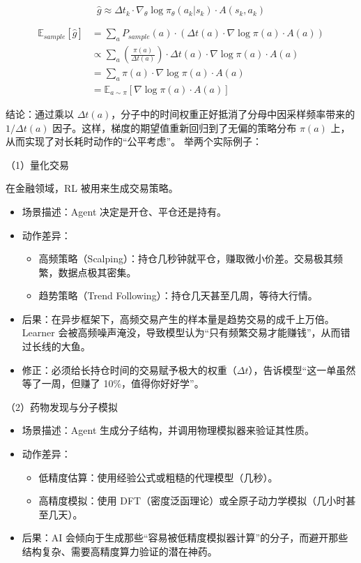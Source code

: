 \[
\hat{g}\approx \Delta t_k\cdot \nabla_\theta\log\pi_\theta(a_k|s_k)\cdot A(s_k,a_k)
\]

\[
\begin{aligned}
\mathbb{E}_{sample}[\hat{g}]
&= \sum_a P_{sample}(a)\cdot\left(\Delta t(a)\cdot\nabla\log\pi(a)\cdot A(a)\right)\\
&\propto \sum_a \left(\frac{\pi(a)}{\Delta t(a)}\right)\cdot\Delta t(a)\cdot\nabla\log\pi(a)\cdot A(a)\\
&= \sum_a \pi(a)\cdot\nabla\log\pi(a)\cdot A(a)\\
&= \mathbb{E}_{a\sim\pi}\left[\nabla\log\pi(a)\cdot A(a)\right]
\end{aligned}
\]

结论：通过乘以 \(\Delta t(a)\)，分子中的时间权重正好抵消了分母中因采样频率带来的 \(1/\Delta t(a)\) 因子。这样，梯度的期望值重新回归到了无偏的策略分布 \(\pi(a)\) 上，从而实现了对长耗时动作的``公平考虑''。
举两个实际例子：

（1）量化交易

在金融领域，RL 被用来生成交易策略。

\begin{itemize}
\tightlist
\item
  场景描述：Agent 决定是开仓、平仓还是持有。
\item
{}
  动作差异：

  \begin{itemize}
  \tightlist
  \item
    高频策略（Scalping）：持仓几秒钟就平仓，赚取微小价差。交易极其频繁，数据点极其密集。
  \item
    趋势策略（Trend Following）：持仓几天甚至几周，等待大行情。
  \end{itemize}
\item
  后果：在异步框架下，高频交易产生的样本量是趋势交易的成千上万倍。Learner 会被高频噪声淹没，导致模型认为``只有频繁交易才能赚钱''，从而错过长线的大鱼。
\item
  修正：必须给长持仓时间的交易赋予极大的权重（\(\Delta t\)），告诉模型``这一单虽然等了一周，但赚了 10\%，值得你好好学''。
\end{itemize}

（2）药物发现与分子模拟

\begin{itemize}
\tightlist
\item
  场景描述：Agent 生成分子结构，并调用物理模拟器来验证其性质。
\item
{}
  动作差异：

  \begin{itemize}
  \tightlist
  \item
    低精度估算：使用经验公式或粗糙的代理模型（几秒）。
  \item
    高精度模拟：使用 DFT（密度泛函理论）或全原子动力学模拟（几小时甚至几天）。
  \end{itemize}
\item
  后果：AI 会倾向于生成那些``容易被低精度模拟器计算''的分子，而避开那些结构复杂、需要高精度算力验证的潜在神药。
\end{itemize}

